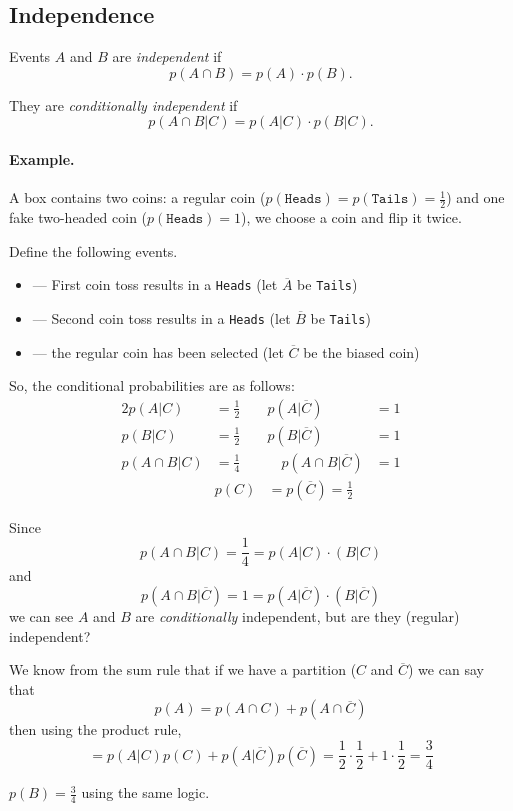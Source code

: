 \subsection{Independence} 
Events $A$ and $B$ are \emph{independent} if \[p(A\cap B) = p(A)\cdot p(B).\]

They are \emph{conditionally independent} if \[p(A\cap B|C) = p(A|C)\cdot p(B|C).\]

\paragraph{Example.}
A box contains two coins: a regular coin ($p(\texttt{Heads})=p(\texttt{Tails})=\frac{1}{2}$) and one fake two-headed coin ($p(\texttt{Heads})=1$), 
we choose a coin and flip it twice.  

Define the following events.
\begin{itemize}
\item[$A$] --- First coin toss results in a \texttt{Heads} (let $\overline{A}$ be \texttt{Tails})
\item[$B$] --- Second coin toss results in a \texttt{Heads}  (let $\overline{B}$ be \texttt{Tails})
\item[$C$] --- the regular coin has been selected  (let $\overline{C}$ be the biased coin)
\end{itemize}

So, the conditional probabilities are as follows: 
\begin{alignat*}{2}
p(A|C) &= \frac{1}{2} & p(A|\overline{C}) &= 1\\
p(B|C) &= \frac{1}{2} & p(B|\overline{C}) &= 1\\
p(A\cap B|C) &= \frac{1}{4} &\quad p(A\cap B|\overline{C}) &= 1\\
&p(C) &= p(\overline{C}) = \frac{1}{2}
\end{alignat*}


Since \[p(A\cap B|C) = \frac{1}{4} = p(A|C)\cdotp(B|C)\]
and \[p(A\cap B|\overline{C}) = 1 = p(A|\overline{C})\cdotp(B|\overline{C})\]
we can see $A$ and $B$ are \textit{conditionally} independent,
but are they (regular) independent? 

We know from the sum rule that if we have a partition ($C$ and $\overline C$) we can say that 
\[p(A) = p(A\cap C) + p(A \cap \overline{C})\]
then using the product rule, 
\[=p(A|C)p(C) + p(A|\overline{C})p(\overline{C}) = \frac{1}{2}\cdot \frac{1}{2} + 1\cdot\frac{1}{2} = \frac{3}{4}\]

$p(B)=\frac{3}{4}$ using the same logic.

